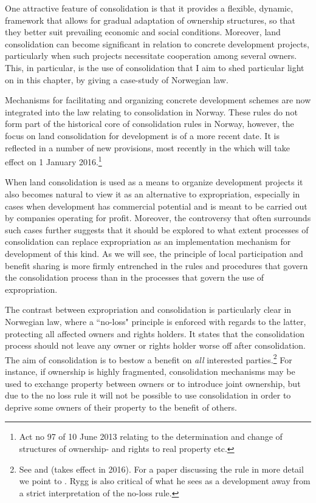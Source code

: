 {One attractive feature of consolidation is that it provides a flexible, dynamic, framework that allows for gradual adaptation of ownership structures, so that they better suit prevailing economic and social conditions. Moreover, land consolidation can become significant in relation to concrete development projects, particularly when such projects necessitate cooperation among several owners. This, in particular, is the use of consolidation that I aim to shed particular light on in this chapter, by giving a case-study of Norwegian law.

Mechanisms for facilitating and organizing concrete development schemes are now integrated into the law relating to consolidation in Norway. These rules do not form part of the historical core of consolidation rules in Norway, however, the focus on land consolidation for development is of a more recent date. It is reflected in a number of new provisions, most recently in the \cite{lca13} which will take effect on 1 January 2016.\footnote{Act no 97 of 10 June 2013 relating to the determination and change of structures of ownership- and rights to real property etc.}

When land consolidation is used as a means to organize development projects it also becomes natural to view it as an alternative to expropriation, especially in cases when development has commercial potential and is meant to be carried out by companies operating for profit. Moreover, the controversy that often surrounds such cases further suggests that it should be explored to what extent processes of consolidation can replace expropriation as an implementation mechanism for development of this kind. As we will see, the principle of local participation and benefit sharing is more firmly entrenched in the rules and procedures that govern the consolidation process than in the processes that govern the use of expropriation. 

The contrast between expropriation and consolidation is particularly clear in Norwegian law, where a ``no-loss" principle is enforced with regards to the latter, protecting all affected owners and rights holders. It states that the consolidation process should not leave any owner or rights holder worse off after consolidation. The aim of consolidation is to bestow a benefit on \emph{all} interested parties.\footnote{See \cite[3 a)]{lca79} and \cite[3-18]{lca13} (takes effect in 2016). For a paper discussing the rule in more detail we point to \cite{rygg98}. Rygg is also critical of what he sees as a development away from a strict interpretation of the no-loss rule.} For instance, if ownership is highly fragmented, consolidation mechanisms may be used to exchange property between owners or to introduce joint ownership, but due to the no loss rule it will not be possible to use consolidation in order to deprive some owners of their property to the benefit of others.

}
